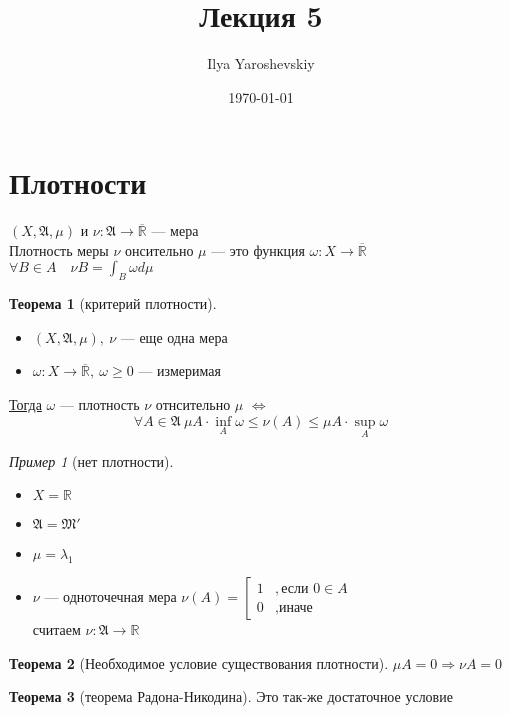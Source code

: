 \documentclass[english]{article}
\author{Ilya Yaroshevskiy}
\date{\today}
\title{Лекция 5}
\newcommand{\R}{\mathbb{R}}
\theoremstyle{plain}
\theoremstyle{remark}
\newtheorem*{examp}{Пример}
\theoremstyle{definition}
\newtheorem{theorem}{Теорема}[section]
\begin{document}
\maketitle
\tableofcontents

\newcommand{\X}{\mathcal{X}}
\newcommand{\A}{\mathfrak{A}}
\newcommand{\B}{\mathfrak{B}}
\newcommand{\M}{\mathfrak{M}}

\section{Плотности}
\label{sec:org01917b7}

 \((X, \A, \mu)\) и \(\nu: \A \to \overline{\R}\) --- мера \\
Плотность  меры \(\nu\) онсительно \(\mu\) --- это функция \(\omega: X \to \overline{\R}\) \\
\(\forall B \in A\quad \nu B = \int_B \omega d\mu\)

\begin{theorem}[критерий плотности]
\-
\begin{itemize}
\item \((X, \A, \mu),\ \nu\) --- еще одна мера
\item \(\omega: X \to \overline{\R},\ \omega \ge 0\) --- измеримая
\end{itemize}
\uline{Тогда} \(\omega\) --- плотность \(\nu\) отнсительно \(\mu\) \(\Leftrightarrow\)
\[ \forall A \in \A\ \mu A \cdot \inf_A \omega \le \nu(A) \le \mu A \cdot \sup_A \omega \]
\end{theorem}
\begin{examp}[нет плотности]
\-
\begin{itemize}
\item \(X = \R\)
\item \(\A = \M'\)
\item \(\mu = \lambda_1\)
\item \(\nu\) --- одноточечная мера \(\nu(A) = \left[\begin{array}{ll} 1 & ,\text{если } 0 \in A \\ 0 & ,\text{иначе}\end{array}\right.\) \\
считаем \(\nu: \A \to \R\)
\end{itemize}
\end{examp}

\begin{theorem}[Необходимое условие существования плотности]
\(\mu A = 0 \Rightarrow \nu A = 0\)
\end{theorem}
\begin{theorem}[теорема Радона-Никодина]
Это так-же достаточное условие
\end{theorem}
\end{document}
